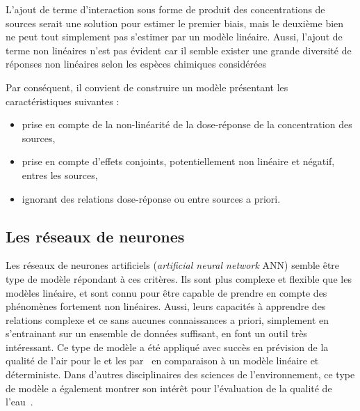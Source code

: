 L'ajout de terme d'interaction sous forme de produit des concentrations de sources serait
une solution pour estimer le premier biais, mais le deuxième bien ne peut tout simplement
pas s'estimer par un modèle linéaire. Aussi, l'ajout de terme non linéaires n'est pas
évident car il semble exister une grande diversité de réponses non linéaires selon les
espèces chimiques
considérées~\autocite{charrierDithiothreitol2012,charrierBias2016,calasImportance2017}

Par conséquent, il convient de construire un modèle présentant les caractéristiques
suivantes :
\begin{itemize}
    \item prise en compte de la non-linéarité de la dose-réponse de la concentration des
        sources,
    \item prise en compte d'effets conjoints, potentiellement non linéaire et négatif,
        entres les sources,
    \item ignorant des relations dose-réponse ou entre sources a priori.
\end{itemize}

\subsection{Les réseaux de neurones}%
\label{sub:les_réseaux_de_neurones}

Les réseaux de neurones artificiels (\textit{artificial neural network} ANN) semble être
type de modèle répondant à ces critères. Ils sont plus complexe et flexible que les
modèles linéaire, et sont connu pour être capable de prendre en compte des phénomènes
fortement non linéaires. Aussi, leurs capacités à apprendre des relations complexe et ce
sans aucunes connaissances a priori, simplement en s'entrainant sur un ensemble de données
suffisant, en font un outil très intéressant.
Ce type de modèle a été appliqué avec succès en prévision de la qualité de l'air pour le
 et les \PMdix{} par~\cite{kukkonenExtensive2003} en comparaison à un modèle
linéaire et déterministe. Dans d'autres disciplinaires des sciences de l'environnement, ce
type de modèle a également montrer son intérêt pour l'évaluation de la qualité de
l'eau~\autocite{nathanApplication2017}.

